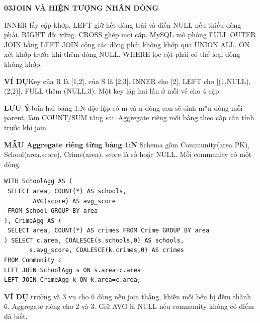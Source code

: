 \documentclass[a4paper]{article}
\newcommand{\bodyfontsize}{5.55}
\newcommand{\bodyleading}{5.2}
\newcommand{\bodylineskiplimit}{-2pt}
\newcommand{\bodystyle}{%
  \fontsize{\bodyfontsize}{\bodyleading}\selectfont\setlength{\lineskiplimit}{\bodylineskiplimit}\RaggedRight
  \setlength{\abovedisplayskip}{.5pt}\setlength{\belowdisplayskip}{.5pt}%
  \setlength{\abovedisplayshortskip}{.3pt}\setlength{\belowdisplayshortskip}{.3pt}}
\newcommand{\topic}[2]{\par\addvspace{.45pt}\nointerlineskip%
  \begingroup\setlength{\fboxsep}{0.35pt}%
  \noindent\colorbox{structure}{\parbox{\dimexpr\linewidth-2\fboxsep\relax}{%
    \color{white}\fontsize{6.45}{6.8}\selectfont\bfseries #1\enspace #2}}%
  \endgroup\par\nobreak\vspace{.55pt}\nointerlineskip\nobreak}
\newenvironment{topicblock}
  {\par\bodystyle}
  {\par}
\newcommand{\key}[1]{\par\textcolor{structure}{\textbf{#1}}\enspace}
\newcommand{\note}[4]{\par\nointerlineskip\vspace{.25pt}\begingroup\setlength{\fboxsep}{0.1pt}%
  \noindent\colorbox{#1}{\parbox{\dimexpr\linewidth-2\fboxsep\relax}{%
    \RaggedRight\textcolor{#2}{\textbf{#3}}\enspace #4}}%
  \endgroup\par\nointerlineskip\vspace{.25pt}}
\newcommand{\trap}[1]{\note{warningbg}{warning}{LƯU Ý}{#1}}
\newcommand{\ex}[1]{\note{examplebg}{example}{VÍ DỤ}{#1}}
\newcommand{\pattern}[1]{\key{MẪU #1}}
\newlength{\sheetwidth}
\newenvironment{sheetcolumns}[1]
  {\noindent\begin{minipage}[t]{#1\sheetwidth}\vspace{0pt}\bodystyle\ignorespaces}
  {\end{minipage}\par}
\begin{document}
\begin{sheetcolumns}{.258}
\begin{topicblock}
\topic{03}{JOIN VÀ HIỆN TƯỢNG NHÂN DÒNG}
INNER lấy cặp khớp. LEFT giữ hết dòng trái và điền NULL nếu thiếu dòng phải. RIGHT đối xứng. CROSS ghép mọi cặp. MySQL mô phỏng FULL OUTER JOIN bằng LEFT JOIN cộng các dòng phải không khớp qua UNION ALL. ON xét khớp trước khi thêm dòng NULL. WHERE lọc cột phải có thể loại dòng không khớp.
\ex{Key của R là [1,2], của S là [2,3]. INNER cho [2], LEFT cho [(1,NULL),(2,2)], FULL thêm (NULL,3). Một key lặp hai lần ở mỗi vế cho 4 cặp.}
\trap{Join hai bảng 1:N độc lập có m và n dòng con sẽ sinh m*n dòng mỗi parent, làm COUNT/SUM tăng sai. Aggregate riêng mỗi bảng theo cấp cần tính trước khi join.}
\pattern{Aggregate riêng từng bảng 1:N}
Schema gồm Community(area PK), School(area,score), Crime(area). score là số hoặc NULL. Mỗi community có một dòng.
\begin{lstlisting}
WITH SchoolAgg AS (
 SELECT area, COUNT(*) AS schools,
        AVG(score) AS avg_score
 FROM School GROUP BY area
), CrimeAgg AS (
 SELECT area, COUNT(*) AS crimes FROM Crime GROUP BY area
) SELECT c.area, COALESCE(s.schools,0) AS schools,
       s.avg_score, COALESCE(k.crimes,0) AS crimes
FROM Community c
LEFT JOIN SchoolAgg s ON s.area=c.area
LEFT JOIN CrimeAgg k ON k.area=c.area;
\end{lstlisting}
\ex{2 trường và 3 vụ cho 6 dòng nếu join thẳng, khiến mỗi bên bị đếm thành 6. Aggregate riêng cho 2 và 3. Giữ AVG là NULL nếu community không có điểm đã biết.}
\end{topicblock}


\end{sheetcolumns}
\end{document}
